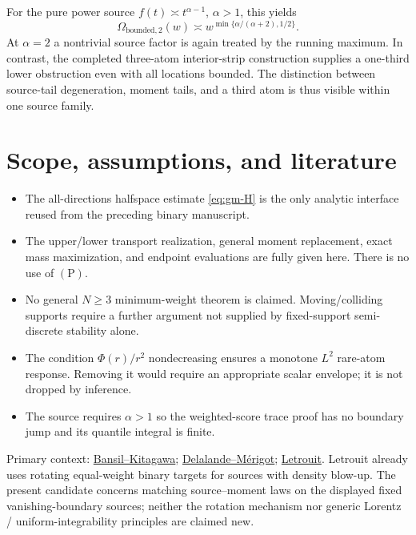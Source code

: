For the pure power source \(f(t)\asymp t^{\alpha-1}\), \(\alpha>1\), this yields
\begin{equation}
 \Omega_{\mathrm{bounded},2}(w)
 \asymp w^{\min\{\alpha/(\alpha+2),1/2\}}.
 \tag{8.1}\label{eq:gm-bounded}
\end{equation}
At \(\alpha=2\) a nontrivial source factor is again treated by the running maximum. In contrast, the completed three-atom interior-strip construction supplies a one-third lower obstruction even with all locations bounded. The distinction between source-tail degeneration, moment tails, and a third atom is thus visible within one source family.

\section{Scope, assumptions, and literature}\label{sec:gm-scope}

\begin{itemize}
\item The all-directions halfspace estimate \eqref{eq:gm-H} is the only analytic interface reused from the preceding binary manuscript. 
\item The upper/lower transport realization, general moment replacement, exact mass maximization, and endpoint evaluations are fully given here. There is no use of \((\mathrm P)\).
\item No general \(N\ge3\) minimum-weight theorem is claimed. Moving/colliding supports require a further argument not supplied by fixed-support semi-discrete stability alone.
\item The condition \(\Phi(r)/r^2\) nondecreasing ensures a monotone \(L^2\) rare-atom response. Removing it would require an appropriate scalar envelope; it is not dropped by inference.
\item The source requires \(\alpha>1\) so the weighted-score trace proof has no boundary jump and its quantile integral is finite.
\end{itemize}

Primary context: \href{https://arxiv.org/html/2002.02022}{Bansil--Kitagawa}; \href{https://arxiv.org/html/2103.05934}{Delalande--M\'erigot}; \href{https://arxiv.org/html/2510.13265v1}{Letrouit}. Letrouit already uses rotating equal-weight binary targets for sources with density blow-up. The present candidate concerns matching source--moment laws on the displayed fixed vanishing-boundary sources; neither the rotation mechanism nor generic Lorentz / uniform-integrability principles are claimed new.

